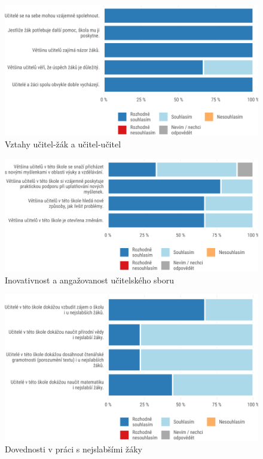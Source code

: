 \documentclass[12pt,a4paper,]{report}
\begin{document}
\begin{figure}

{\centering \includegraphics[width=\textwidth]{figs/tots1q1T3STUDappdx-1}

}

\caption{Vztahy učitel-žák a učitel-učitel}\label{fig:tots1q1T3STUDappdx}
\end{figure}

\begin{figure}

{\centering \includegraphics[width=\textwidth]{figs/tots1q3T3TEAMappdx-1}

}

\caption{Inovativnost a angažovanost učitelského sboru}\label{fig:tots1q3T3TEAMappdx}
\end{figure}

\begin{figure}

{\centering \includegraphics[width=\textwidth]{figs/tots1q4weakappdx-1}

}

\caption{Dovednosti v práci s nejslabšími žáky}\label{fig:tots1q4weakappdx}
\end{figure}
\end{document}
